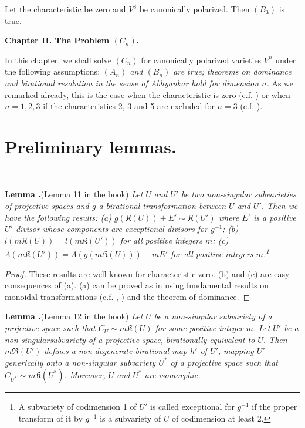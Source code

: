 \begin{coro*}
Let the characteristic be zero and $V^{3}$ be canonically polarized. Then $(B_{3})$ is true.
\end{coro*}

\newpage

\begin{center}
{\Large\bf Chapter II. The Problem \boldmath$(C_{n})$.}
\end{center}

In this chapter, we shall solve $(C_{n})$ for canonically polarized varieties $V^{n}$ under the following assumptions: {\em $(A_{n})$ and $(B_{n})$ are true; theorems on dominance and birational resolution in the sense of Abhyankar hold for dimension $n$.} As we remarked already, this is the case when the characteristic is zero (c.f. \cite{art14-key5}) or when $n=1,2,3$ if the characteristics 2, 3 and 5 are excluded for $n=3$ (c.f. \cite{art14-key35}).

\section{Preliminary lemmas.}\label{art14-sec8}

~

\medskip
\noindent
{\bf Lemma .\label{art14-lem12}}(Lemma 11 in the book)
{\em Let $U$ and $U'$ be two non-singular subvarieties of projective spaces and $g$ a birational transformation between $U$ and $U'$. Then we have the following results: {\rm(a)} $g(\mathfrak{K}(U))+E'\sim \mathfrak{K}(U')$ where $E'$ is a positive $U'$-divisor whose components are exceptional divisors for $g^{-1}$; {\rm(b)} $l(m\mathfrak{K}(U))=l(m\mathfrak{K}(U'))$ for all positive integers $m$; {\rm(c)} $\Lambda(m\mathfrak{K}(U'))=\Lambda(g(m\mathfrak{K}(U)))+mE'$ for all positive integers $m$.\footnote{A subvariety of codimension 1 of $U'$ is called exceptional for $g^{-1}$ if the proper transform of it by $g^{-1}$ is a subvariety of $U$ of codimension at least 2.}}

\begin{proof}
These results are well known for characteristic zero. (b) and (c) are easy consequences of (a). (a) can be proved as in \cite{art14-key33} using fundamental results on monoidal transformations (c.f. \cite{art14-key29}, \cite{art14-key33}) and the theorem of dominance.
\end{proof}

\medskip
\noindent
{\bf Lemma .\label{art14-lem13}}(Lemma 12 in the book)
{\em Let $U$ be a non-singular subvariety of a projective space such that $C_{U}\sim m\mathfrak{K}(U)$ for some positive integer $m$. Let $U'$ be a non-singular\pageoriginale subvariety of a projective space, birationally equivalent to $U$. Then $m\mathfrak{R}(U')$ defines a non-degenerate birational map $h'$ of $U'$, mapping $U'$ generically onto a non-singular subvariety $U^{*}$ of a projective space such that $C_{U^{*}}\sim m\mathfrak{K}(U^{*})$. Moreover, $U$ and $U^{*}$ are isomorphic.}

